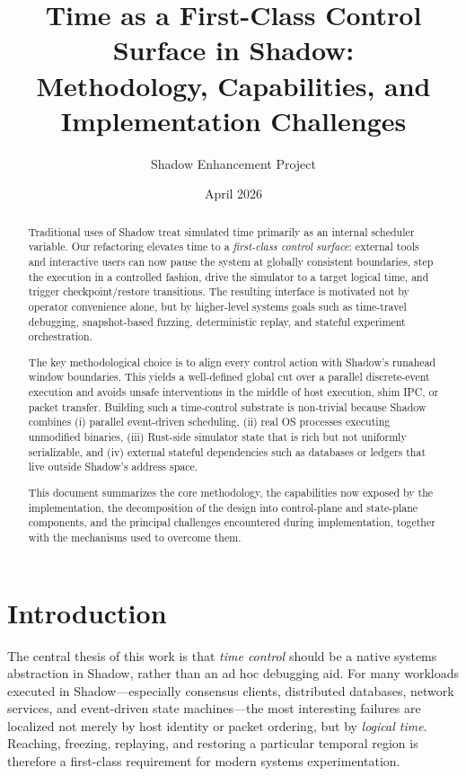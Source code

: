\documentclass[11pt,a4paper]{article}
\title{Time as a First-Class Control Surface in Shadow:\\Methodology, Capabilities, and Implementation Challenges}
\author{Shadow Enhancement Project}
\date{April 2026}
\begin{document}
\maketitle

\begin{abstract}
Traditional uses of Shadow treat simulated time primarily as an internal
scheduler variable. Our refactoring elevates time to a \emph{first-class
control surface}: external tools and interactive users can now pause the
system at globally consistent boundaries, step the execution in a controlled
fashion, drive the simulator to a target logical time, and trigger
checkpoint/restore transitions. The resulting interface is motivated not by
operator convenience alone, but by higher-level systems goals such as
time-travel debugging, snapshot-based fuzzing, deterministic replay, and
stateful experiment orchestration.

The key methodological choice is to align every control action with
Shadow's runahead window boundaries. This yields a well-defined global cut
over a parallel discrete-event execution and avoids unsafe interventions in
the middle of host execution, shim IPC, or packet transfer. Building such a
time-control substrate is non-trivial because Shadow combines
(i) parallel event-driven scheduling,
(ii) real OS processes executing unmodified binaries,
(iii) Rust-side simulator state that is rich but not uniformly serializable,
and (iv) external stateful dependencies such as databases or ledgers that
live outside Shadow's address space.

This document summarizes the core methodology, the capabilities now exposed
by the implementation, the decomposition of the design into control-plane and
state-plane components, and the principal challenges encountered during
implementation, together with the mechanisms used to overcome them.
\end{abstract}

\tableofcontents
\newpage

\section{Introduction}

The central thesis of this work is that \emph{time control} should be a
native systems abstraction in Shadow, rather than an ad hoc debugging aid.
For many workloads executed in Shadow---especially consensus clients,
distributed databases, network services, and event-driven state machines---the
most interesting failures are localized not merely by host identity or packet
ordering, but by \emph{logical time}. Reaching, freezing, replaying, and
restoring a particular temporal region is therefore a first-class requirement
for modern systems experimentation.
\end{document}
